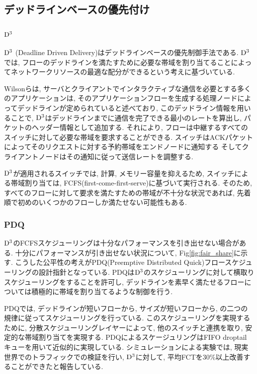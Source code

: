 \subsection{デッドラインベースの優先付け}
\subsubsection{${\rm D^3}$}
${\rm D^3}$ (Deadline Driven Delivery)\cite{d3}はデッドラインベースの優先制御手法である. 
${\rm D^3}$では, フローのデッドラインを満たすために必要な帯域を割り当てることによってネットワークリソースの最適な配分ができるという考えに基づいている. 

Wilsonら\cite{d3}は, サーバとクライアントでインタラクティブな通信を必要とする多くのアプリケーションは,
そのアプリケーションフローを生成する処理ノードによってデッドラインが定められていると述べており, このデッドライン情報を用いることで,
$ {\rm D^3}$はデッドラインまでに通信を完了できる最小のレートを算出し, パケットのヘッダー情報として追加する. 
それにより, フローは中継するすべてのスイッチに対して必要な帯域を要求することができる. 
スイッチはACKパケットによってそのリクエストに対する予約帯域をエンドノードに通知する
そしてクライアントノードはその通知に従って送信レートを調整する. 

${\rm D^3}$が適用されるスイッチでは, 計算, メモリー容量を抑えるため, スイッチによる帯域割り当ては,
FCFS(first-come-first-serve)に基づいて実行される.
そのため, すべてのフローに対して要求を満たすための帯域が不十分な状況であれば, 先着順で初めのいくつかのフローしか満たせない可能性もある. 

\subsubsection{PDQ}
${\rm D^3}$のFCFSスケジューリングは十分なパフォーマンスを引き出せない場合がある. 
十分にパフォーマンスが引き出せない状況について, Fig\ref{fig:fair_share}に示す. 
こうした公平性の考えがPDQ(Preemptive Distributed Quick)フロースケジューリングの設計指針となっている. 
PDQは${\rm D^3}$のスケジューリングに対して横取りスケジューリングをすることを許可し,
デッドラインを素早く満たせるフローについては積極的に帯域を割り当てるような制御を行う. 

PDQでは, デッドラインが短いフローから, サイズが短いフローから, の二つの規律に従ってスケジューリングを行っている. 
このスケジューリングを実現するために, 分散スケジューリングレイヤーによって, 他のスイッチと連携を取り, 安定的な帯域割り当てを実現する. 
PDQによるスケージュリングはFIFO droptail キューを用いて近似的に実現している. 
シミュレーションによる実験では, 現実世界でのトラフィックでの検証を行い, ${\rm D^3}$に対して, 平均FCTを30\%以上改善することができたと報告している. 

